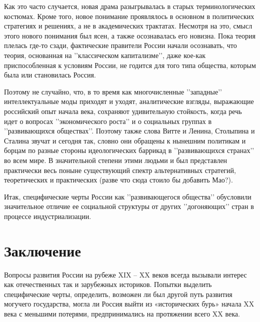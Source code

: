 \documentclass[12pt]{article}
\begin{document}
Как это часто случается, новая драма разыгрывалась в старых терминологических костюмах. Кроме того, новое понимание проявлялось в основном в политических стратегиях и решениях, а не в академических трактатах. Несмотря на это, смысл этого нового понимания был ясен, а также осознавалась его новизна. Пока теория плелась где-то сзади, фактические правители России начали осознавать, что теория, основанная на \rq\rq{}классическом капитализме\rq\rq{}, даже кое-как приспособленная к условиям России, не годится для того типа общества, которым была или становилась Россия.

Поэтому не случайно, что, в то время как многочисленные \rq\rq{}западные\rq\rq{} интеллектуальные моды приходят и уходят, аналитические взгляды, выражающие российский опыт начала века, сохраняют удивительную стойкость, когда речь идет о вопросах \rq\rq{}экономического роста\rq\rq{} и о социальных группах в \rq\rq{}развивающихся обществах\rq\rq{}. Поэтому также слова Витте и Ленина, Столыпина и Сталина звучат и сегодня так, словно они обращены к нынешним политикам и борцам по разные стороны идеологических баррикад в \rq\rq{}развивающихся странах\rq\rq{} во всем мире. В значительной степени этими людьми и был представлен практически весь поныне существующий спектр альтернативных стратегий, теоретических и практических (разве что сюда стоило бы добавить Мао?).

Итак, специфические черты России как \rq\rq{}развивающегося общества\rq\rq{} обусловили значительное отличие ее социальной структуры от других \rq\rq{}догоняющих\rq\rq{} стран в процессе индустриализации.
\section* {Заключение}

Вопросы развития России на рубеже XIX – XX веков всегда вызывали интерес как отечественных так и зарубежных историков. Попытки выделить специфические черты, определить, возможен ли был другой путь развития могучего государства, могла ли Россия выйти из «исторических бурь» начала XX века с меньшими потерями, предпринимались на протяжении всего XX века.   
\end{document}
